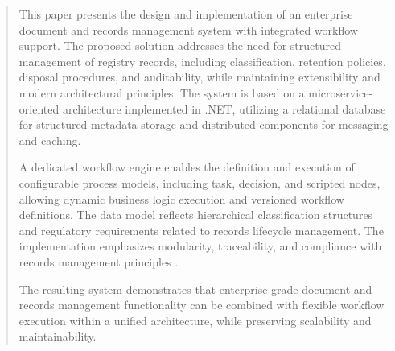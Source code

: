 ﻿%
\begin{abstract}
This paper presents the design and implementation of an enterprise document and records management system with integrated workflow support. 
The proposed solution addresses the need for structured management of registry records, including classification, retention policies, disposal procedures, and auditability, 
while maintaining extensibility and modern architectural principles. 
The system is based on a microservice-oriented architecture implemented in .NET, utilizing a relational database for structured metadata storage and distributed components for messaging and caching. 

A dedicated workflow engine enables the definition and execution of configurable process models, including task, decision, and scripted nodes, allowing dynamic business logic execution and versioned workflow definitions. 
The data model reflects hierarchical classification structures and regulatory requirements related to records lifecycle management. 
The implementation emphasizes modularity, traceability, and compliance with records management principles \cite{iso15489,moreq2010}.

The resulting system demonstrates that enterprise-grade document and records management functionality can be combined with flexible workflow execution within a unified architecture, 
while preserving scalability and maintainability.
\end{abstract}
